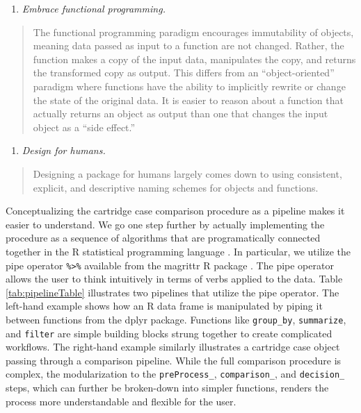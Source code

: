 \documentclass[11pt,]{isuthesis}
\providecommand{\tightlist}{%
  \setlength{\itemsep}{0pt}\setlength{\parskip}{0pt}}
\begin{document}
\begin{enumerate}
\def\labelenumi{\arabic{enumi}.}
\setcounter{enumi}{2}
\tightlist
\item
  \emph{Embrace functional programming.}
\end{enumerate}

\begin{quote}
The functional programming paradigm encourages immutability of objects, meaning data passed as input to a function are not changed.
Rather, the function makes a copy of the input data, manipulates the copy, and returns the transformed copy as output.
This differs from an ``object-oriented'' paradigm where functions have the ability to implicitly rewrite or change the state of the original data.
It is easier to reason about a function that actually returns an object as output than one that changes the input object as a ``side effect.''
\end{quote}

\begin{enumerate}
\def\labelenumi{\arabic{enumi}.}
\setcounter{enumi}{3}
\tightlist
\item
  \emph{Design for humans.}
\end{enumerate}

\begin{quote}
Designing a package for humans largely comes down to using consistent, explicit, and descriptive naming schemes for objects and functions.
\end{quote}

Conceptualizing the cartridge case comparison procedure as a pipeline makes it easier to understand.
We go one step further by actually implementing the procedure as a sequence of algorithms that are programatically connected together in the R statistical programming language \citep{Rlanguage}.
In particular, we utilize the pipe operator \texttt{\%\textgreater{}\%} available from the magrittr R package \citep{magrittr}.
The pipe operator allows the user to think intuitively in terms of verbs applied to the data.
Table \ref{tab:pipelineTable} illustrates two pipelines that utilize the pipe operator.
The left-hand example shows how an R data frame is manipulated by piping it between functions from the dplyr package.
Functions like \texttt{group\_by}, \texttt{summarize}, and \texttt{filter} are simple building blocks strung together to create complicated workflows.
The right-hand example similarly illustrates a cartridge case object passing through a comparison pipeline.
While the full comparison procedure is complex, the modularization to the \texttt{preProcess\_}, \texttt{comparison\_}, and \texttt{decision\_} steps, which can further be broken-down into simpler functions, renders the process more understandable and flexible for the user.
\end{document}
